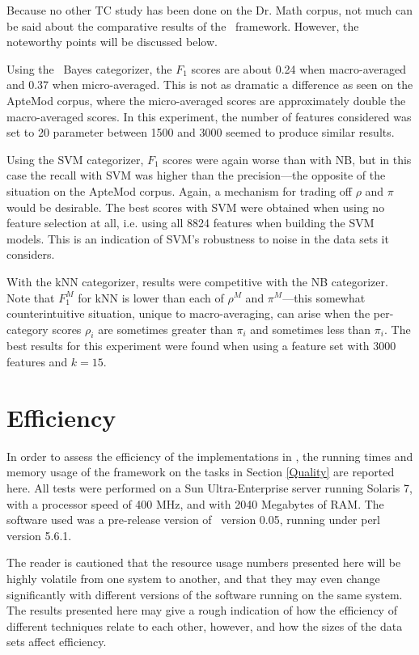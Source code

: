 Because no other TC study has been done on the Dr. Math corpus, not
much can be said about the comparative results of the \aicat\
framework.  However, the noteworthy points will be discussed below.

Using the \naive\ Bayes categorizer, the $F_1$ scores are about 0.24
when macro-averaged and 0.37 when micro-averaged.  This is not as
dramatic a difference as seen on the ApteMod corpus, where the
micro-averaged scores are approximately double the macro-averaged
scores.  In this experiment, the number of features considered was set
to 20%
parameter between 1500 and 3000 seemed to produce similar results.

Using the SVM categorizer, $F_1$ scores were again worse than with NB,
but in this case the recall with SVM was higher than the
precision---the opposite of the situation on the ApteMod corpus.
Again, a mechanism for trading off $\rho$ and $\pi$ would be
desirable.  The best scores with SVM were obtained when using no
feature selection at all, i.e. using all 8824 features when building
the SVM models.  This is an indication of SVM's robustness to noise in
the data sets it considers.

With the kNN categorizer, results were competitive with the NB
categorizer.  Note that $F_1^M$ for kNN is lower than each of $\rho^M$
and $\pi^M$---this somewhat counterintuitive situation, unique to
macro-averaging, can arise when the per-category scores $\rho_i$ are
sometimes greater than $\pi_i$ and sometimes less than $\pi_i$.  The
best results for this experiment were found when using a feature set
with 3000 features and $k=15$.


\section{Efficiency}
\label{Efficiency}

In order to assess the efficiency of the implementations in \aicat,
the running times and memory usage of the framework on the tasks in
Section \ref{Quality} are reported here.  All tests were performed on
a Sun Ultra-Enterprise server running Solaris 7, with a processor
speed of 400 MHz, and with 2040 Megabytes of RAM.  The software used
was a pre-release version of \aicat\ version 0.05, running under perl
version 5.6.1.

The reader is cautioned that the resource usage numbers presented here
will be highly volatile from one system to another, and that they may
even change significantly with different versions of the software
running on the same system.  The results presented here may give a
rough indication of how the efficiency of different techniques relate
to each other, however, and how the sizes of the data sets affect
efficiency.

